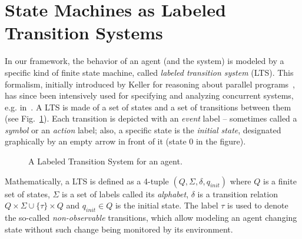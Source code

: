 \section{State Machines as Labeled Transition Systems\label{section:background-state-machines}}

In our framework, the behavior of an agent (and the system) is modeled by a specific kind of finite state machine, called \emph{labeled transition system} (LTS). This formalism, initially introduced by Keller for reasoning about parallel programs~\cite{Keller:1976}, has since been intensively used for specifying and analyzing concurrent systems, e.g. in~\cite{Milner:1989, Clarke:1989, Magee:1997}. A LTS is made of a set of states and a set of transitions between them (see Fig.~\ref{image:framework-start-stop}). Each transition is depicted with an \emph{event} label -- sometimes called a \emph{symbol} or an \emph{action} label; also, a specific state is the \emph{initial state}, designated graphically by an empty arrow in front of it (state 0 in the figure). 

\vspace{0.5cm}
\begin{figure}[H]
\centering{}
  \caption{A Labeled Transition System for an  agent\label{image:framework-start-stop}.}
\end{figure}

Mathematically, a LTS is defined as a 4-tuple $(Q,\Sigma,\delta,q_{init})$ where $Q$ is a finite set of states, $\Sigma$ is a set of labels called its \emph{alphabet}, $\delta$ is a transition relation $Q \times \Sigma\cup\{\tau\} \times Q$ and $q_{init} \in Q$ is the initial state. The label $\tau$ is used to denote the so-called \emph{non-observable} transitions, which allow modeling an agent changing state without such change being monitored by its environment. 

